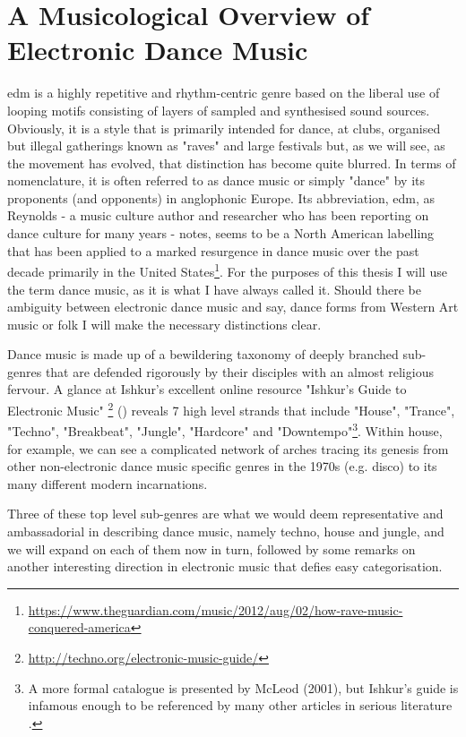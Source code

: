 \chapter{A Musicological Overview of Electronic Dance Music}
\label{chap:dancemusic}

\acrfull{edm} is a highly repetitive and rhythm-centric genre based on the liberal use of looping motifs consisting of layers of sampled and synthesised sound sources. Obviously, it is a style that is primarily intended for dance, at clubs, organised but illegal gatherings known as "raves" and large festivals but, as we will see, as the movement has evolved, that distinction has become quite blurred. In terms of nomenclature, it is often referred to as dance music or simply "dance" by its proponents (and opponents) in anglophonic Europe. Its abbreviation, \acrshort{edm}, as Reynolds - a music culture author and researcher who has been reporting on dance culture for many years - notes, seems to be a North American labelling that has been applied to a marked resurgence in dance music over the past decade primarily in the United States\footnote{\url{https://www.theguardian.com/music/2012/aug/02/how-rave-music-conquered-america}}. For the purposes of this thesis I will use the term dance music, as it is what I have always called it. Should there be ambiguity between electronic dance music and say, dance forms from Western Art music or folk I will make the necessary distinctions clear.

Dance music is made up of a bewildering taxonomy of deeply branched sub-genres that are defended rigorously by their disciples with an almost religious fervour. A glance at Ishkur's excellent online resource "Ishkur's Guide to Electronic Music" \footnote{\url{http://techno.org/electronic-music-guide/}}
() reveals 7 high level strands that include "House", "Trance", "Techno", "Breakbeat", "Jungle", "Hardcore" and "Downtempo"\footnote{A more formal catalogue is presented by McLeod (2001), but Ishkur’s guide is infamous enough to be referenced by many other articles in serious literature
\citep{leimeister2014rhythmic, Pampalk2005}.}. Within house, for example, we can see a complicated network of arches tracing its genesis from other non-electronic dance music specific genres in the 1970s (e.g. disco) to its many different modern incarnations. 

Three of these top level sub-genres are what we would deem representative and ambassadorial in describing dance music, namely techno, house and jungle, and we will expand on each of them now in turn, followed by some remarks on another interesting direction in electronic music that defies easy categorisation.

